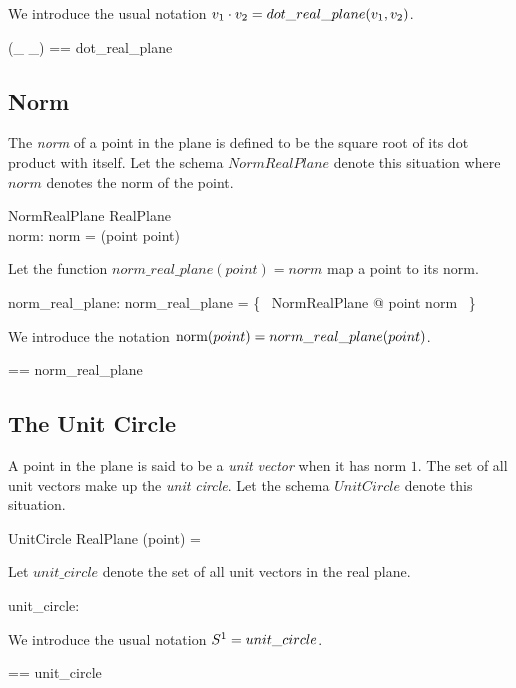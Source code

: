 \documentclass[11pt, oneside]{article}
\begin{document}
We introduce the usual notation $v_1 \mathbin{\cdot} v_2 = dot\_real\_plane(v_1, v_2)$.

\begin{zed}
	(\_ \dotRtwo \_) == dot\_real\_plane
\end{zed}

\subsection{Norm}

The \textit{norm} of a point in the plane is defined to be the square root of its dot product with itself.
Let the schema $NormRealPlane$ denote this situation where $norm$ denotes the norm of the point.

\begin{schema}{NormRealPlane}
	RealPlane \\
	norm: \Rgez
\where
	norm = \sqrtR(point \dotRtwo point)
\end{schema}

Let the function $norm\_real\_plane(point) = norm$ map a point to its norm.

\begin{axdef}
	norm\_real\_plane: \Rtwo \fun \Rgez
\where
	norm\_real\_plane = \{~ NormRealPlane @ point \mapsto norm ~\}
\end{axdef}

We introduce the notation $\operatorname{norm}(point) = norm\_real\_plane(point)$.

\begin{zed}
	\normRtwo == norm\_real\_plane
\end{zed}

\subsection{The Unit Circle}

A point in the plane is said to be a \textit{unit vector} when it has norm $1$.
The set of all unit vectors make up the \textit{unit circle}.
Let the schema $UnitCircle$ denote this situation.

\begin{schema}{UnitCircle}
	RealPlane
\where
	\normRtwo(point) = \oneR
\end{schema}

Let $unit\_circle$ denote the set of all unit vectors in the real plane.

\begin{axdef}
	unit\_circle: \power \Rtwo
\end{axdef}

We introduce the usual notation $S^1 = unit\_circle$.

\begin{zed}
	\sphereOne == unit\_circle
\end{zed}


\printbibliography
\end{document}
